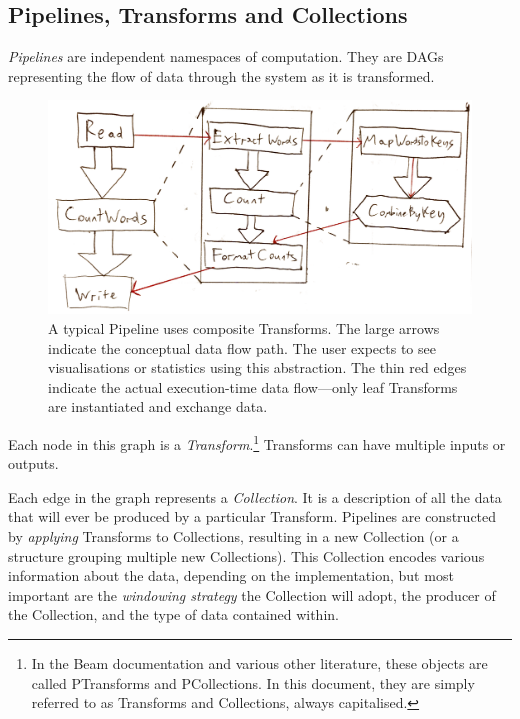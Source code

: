 \subsection{Pipelines, Transforms and Collections}\label{sec:impl:dataflow:pipelines-transforms-collections}

\emph{Pipelines} are independent namespaces of computation.
They are DAGs representing the flow of data through the system as it is transformed.

\begin{figure}[t]
	\includegraphics[width=\textwidth]{images/temp/composite-example}
	\caption[An illustration of the function of composite Transforms in a typical Pipeline.]{A typical Pipeline uses composite Transforms. The large arrows indicate the conceptual data flow path. The user expects to see visualisations or statistics using this abstraction. The thin red edges indicate the actual execution-time data flow---only leaf Transforms are instantiated and exchange data.}
	\label{fig:impl:composite-transforms}
\end{figure}

Each node in this graph is a \emph{Transform}.\footnote
{
In the Beam documentation and various other literature, these objects are called PTransforms and PCollections.
In this document, they are simply referred to as Transforms and Collections, always capitalised.
}
Transforms can have multiple inputs or outputs.

Each edge in the graph represents a \emph{Collection}.
It is a description of all the data that will ever be produced by a particular Transform.
Pipelines are constructed by \emph{applying} Transforms to Collections, resulting in a new Collection (or a structure grouping multiple new Collections).
This Collection encodes various information about the data, depending on the implementation, but most important are the \emph{windowing strategy} the Collection will adopt, the producer of the Collection, and the type of data contained within.

